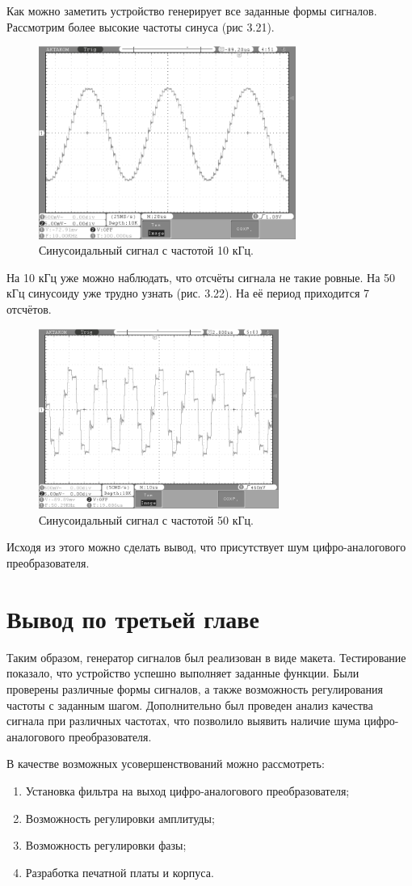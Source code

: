 	Как можно заметить устройство генерирует все заданные формы сигналов. Рассмотрим более высокие частоты синуса (рис 3.21).
	
	\begin{figure}[H]
    \centering
    \includegraphics[width=0.75\textwidth]{../image/sin10.bmp}
    \caption{Синусоидальный сигнал с частотой 10 кГц.}
	\end{figure}	
	
	На 10 кГц уже можно наблюдать, что отсчёты сигнала не такие ровные. На 50 кГц синусоиду уже трудно узнать (рис. 3.22). На её период приходится 7 отсчётов.
	
	\begin{figure}[H]
    \centering
    \includegraphics[width=0.7\textwidth]{../image/sin50.bmp}
    \caption{Синусоидальный сигнал с частотой 50 кГц.}
	\end{figure}	
	
	Исходя из этого можно сделать вывод, что присутствует шум цифро-аналогового преобразователя. 

\section{Вывод по третьей главе}
	Таким образом, генератор сигналов был реализован в виде макета. Тестирование показало, что устройство успешно выполняет заданные функции. Были проверены различные формы сигналов, а также возможность регулирования частоты с заданным шагом. Дополнительно был проведен анализ качества сигнала при различных частотах, что позволило выявить наличие шума цифро-аналогового преобразователя. 
	
	В качестве возможных усовершенствований можно рассмотреть:
	\begin{enumerate}
	\item Установка фильтра на выход цифро-аналогового преобразователя;
	\item Возможность регулировки амплитуды;
	\item Возможность регулировки фазы;
	\item Разработка печатной платы и корпуса.
	\end{enumerate}
